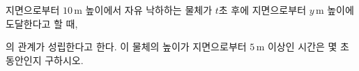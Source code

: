 \hspace*{2mm}\begin{minipage}[t]{\dimexpr\linewidth-2mm\relax}\vspace{0pt}
지면으로부터 $10\,\mathrm{m}$ 높이에서 자유 낙하하는 물체가 $t$초 후에 지면으로부터 $y\,\mathrm{m}$ 높이에 도달한다고 할 때,\par\smallskip{}\par\smallskip\noindent 의 관계가 성립한다고 한다. 이 물체의 높이가 지면으로부터 $5\,\mathrm{m}$ 이상인 시간은 몇 초 동안인지 구하시오.\end{minipage}
